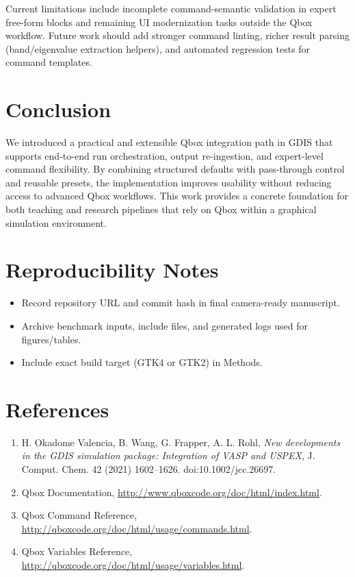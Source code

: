 \documentclass[11pt,a4paper]{article}
\begin{document}
Current limitations include incomplete command-semantic validation in expert free-form blocks and remaining UI modernization tasks outside the Qbox workflow.
Future work should add stronger command linting, richer result parsing (band/eigenvalue extraction helpers), and automated regression tests for command templates.

\section{Conclusion}
We introduced a practical and extensible Qbox integration path in GDIS that supports end-to-end run orchestration, output re-ingestion, and expert-level command flexibility.
By combining structured defaults with pass-through control and reusable presets, the implementation improves usability without reducing access to advanced Qbox workflows.
This work provides a concrete foundation for both teaching and research pipelines that rely on Qbox within a graphical simulation environment.

\section*{Reproducibility Notes}
\begin{itemize}
  \item Record repository URL and commit hash in final camera-ready manuscript.
  \item Archive benchmark inputs, include files, and generated logs used for figures/tables.
  \item Include exact build target (GTK4 or GTK2) in Methods.
\end{itemize}

\section*{References}
\begin{enumerate}
  \item H. Okadome Valencia, B. Wang, G. Frapper, A. L. Rohl, \emph{New developments in the GDIS simulation package: Integration of VASP and USPEX}, J. Comput. Chem. 42 (2021) 1602--1626. doi:10.1002/jcc.26697.
  \item Qbox Documentation, \url{http://www.qboxcode.org/doc/html/index.html}.
  \item Qbox Command Reference, \url{http://qboxcode.org/doc/html/usage/commands.html}.
  \item Qbox Variables Reference, \url{http://qboxcode.org/doc/html/usage/variables.html}.
\end{enumerate}
\end{document}
